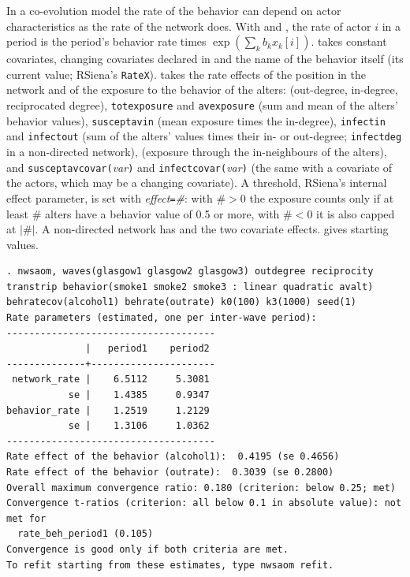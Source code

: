 In a co-evolution model the rate of the behavior can depend on actor characteristics as the rate of the network does. With  and , the rate of actor $i$ in a period is the period's behavior rate times $\exp(\sum_k b_k x_k[i])$.  takes constant covariates, changing covariates declared in  and the name of the behavior itself (its current value; RSiena's \texttt{RateX}).  takes the rate effects of the position in the network and of the exposure to the behavior of the alters:  (out-degree, in-degree, reciprocated degree), \texttt{totexposure} and \texttt{avexposure} (sum and mean of the alters' behavior values), \texttt{susceptavin} (mean exposure times the in-degree), \texttt{infectin} and \texttt{infectout} (sum of the alters' values times their in- or out-degree; \texttt{infectdeg} in a non-directed network),  (exposure through the in-neighbours of the alters), and \texttt{susceptavcovar(}\emph{var}\texttt{)} and \texttt{infectcovar(}\emph{var}\texttt{)} (the same with a covariate of the actors, which may be a changing covariate). A threshold, RSiena's internal effect parameter, is set with \emph{effect}\texttt{=}\emph{\#}: with $\#>0$ the exposure counts only if at least $\#$ alters have a behavior value of 0.5 or more, with $\#<0$ it is also capped at $|\#|$. A non-directed network has  and the two covariate effects.  gives starting values.
\begin{lstlisting}
. nwsaom, waves(glasgow1 glasgow2 glasgow3) outdegree reciprocity transtrip behavior(smoke1 smoke2 smoke3 : linear quadratic avalt) behratecov(alcohol1) behrate(outrate) k0(100) k3(1000) seed(1)
Rate parameters (estimated, one per inter-wave period):
-------------------------------------
              |   period1    period2
--------------+----------------------
 network_rate |    6.5112     5.3081
           se |    1.4385     0.9347
behavior_rate |    1.2519     1.2129
           se |    1.3106     1.0362
-------------------------------------
Rate effect of the behavior (alcohol1):  0.4195 (se 0.4656)
Rate effect of the behavior (outrate):  0.3039 (se 0.2800)
Overall maximum convergence ratio: 0.180 (criterion: below 0.25; met)
Convergence t-ratios (criterion: all below 0.1 in absolute value): not met for
  rate_beh_period1 (0.105)
Convergence is good only if both criteria are met.
To refit starting from these estimates, type nwsaom refit.
\end{lstlisting}
